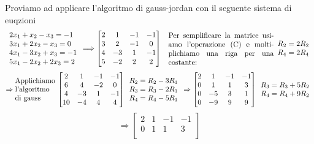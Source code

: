 \begin{example}
Proviamo ad applicare l'algoritmo di gauss-jordan con il seguente sistema di euqzioni
\[
    \begin{array}{l}
    2x_1 + x_2 - x_3 = -1\\
    3x_1 + 2x_2 - x_3 = 0\\
    4x_1 - 3x_2 + x_3 = -1\\
    5x_1 - 2x_2 + 2x_3 = 2
    \end{array}
    \Longrightarrow
    \begin{bmatrix}
    2 & 1 & -1 & -1\\
    3 & 2 & -1 & 0\\
    4 & -3 & 1 & -1\\
    5 & -2 & 2 & 2
    \end{bmatrix}
    \hspace{.3cm}
    \parbox{5cm}{Per semplificare la matrice usiamo l'operazione (C) e moltiplichiamo una riga per una costante:}
    \begin{array}{l}
    R_2 = 2R_2\\
    R_4 = 2R_4
    \end{array}
\]
\[          
    \Rightarrow
    \parbox{2cm}{Applichiamo l'algoritmo di gauss}
    \begin{bmatrix}
    2 & 1 & -1 & -1\\
    6 & 4 & -2 & 0\\
    4 & -3 & 1 & -1\\
    10 & -4 & 4 & 4
    \end{bmatrix}
    \begin{array}{l}
    R_2 = R_2 - 3R_1\\
    R_3 = R_3 - 2R_1\\
    R_4 = R_4 - 5R_1
    \end{array}
    \Rightarrow
    \begin{bmatrix}
    2 & 1 & -1 & -1\\
    0 & 1 & 1 & 3\\
    0 & -5 & 3 & 1\\
    0 & -9 & 9 & 9
    \end{bmatrix}
    \begin{array}{l}
    R_3 = R_3 + 5R_2\\
    R_4 = R_4 + 9R_2
    \end{array}
\]
\[
    \Rightarrow
    \begin{bmatrix}
    2 & 1 & -1 & -1\\
    0 & 1 & 1 & 3\\

\end{bmatrix}\]
\end{example}
